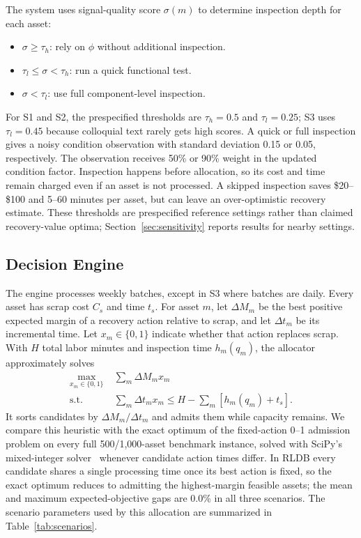 \documentclass[a4paper,conference]{IEEEtran}
\begin{document}
The system uses signal-quality score $\sigma(m)$ to determine inspection depth for each asset:
\begin{itemize}[noitemsep]
  \item $\sigma\geq\tau_h$: rely on $\phi$ without additional inspection.
  \item $\tau_l\leq\sigma<\tau_h$: run a quick functional test.
  \item $\sigma<\tau_l$: use full component-level inspection.
\end{itemize}
For S1 and S2, the prespecified thresholds are $\tau_h{=}0.5$ and
$\tau_l{=}0.25$; S3 uses
$\tau_l{=}0.45$ because colloquial text rarely gets high scores.
A quick or full inspection gives a noisy condition observation with standard
deviation 0.15 or 0.05, respectively. The observation receives 50\% or 90\%
weight in the updated condition factor. Inspection happens before allocation, so
its cost and time remain charged even if an asset is not processed. A skipped
inspection saves \$20--\$100 and 5--60 minutes per asset, but can leave an
over-optimistic recovery estimate. These thresholds are prespecified reference
settings rather than claimed recovery-value optima;
Section~\ref{sec:sensitivity} reports results for nearby settings.

\subsection{Decision Engine}

The engine processes weekly batches, except in S3 where batches are daily. Every
asset has scrap cost $C_s$ and time $t_s$. For asset $m$, let $\Delta M_m$ be the
best positive expected margin of a recovery action relative to scrap, and let
$\Delta t_m$ be its incremental time. Let $x_m\in\{0,1\}$ indicate whether that
action replaces scrap. With $H$ total labor minutes and inspection time $h_m(q_m)$,
the allocator approximately solves
\begin{equation}
 \begin{aligned}
 \max_{x_m\in\{0,1\}}\;&\sum_m \Delta M_mx_m \\
 \mathrm{s.t.}\;&\sum_m \Delta t_mx_m\le H-\sum_m[h_m(q_m)+t_s].
 \end{aligned}
 \label{eq:allocation}
\end{equation}
It sorts candidates by $\Delta M_m/\Delta t_m$ and admits them while capacity remains. We compare
this heuristic with the exact optimum of the fixed-action 0--1 admission problem on
every full 500/1,000-asset benchmark instance, solved with SciPy's mixed-integer solver~\cite{Virtanen2020} whenever candidate
action times differ. In RLDB every candidate shares a single processing time once
its best action is fixed, so the exact optimum reduces to admitting the
highest-margin feasible assets; the mean and maximum expected-objective gaps are
0.0\% in all three scenarios. The scenario parameters used by this allocation
are summarized in Table~\ref{tab:scenarios}.
\end{document}
